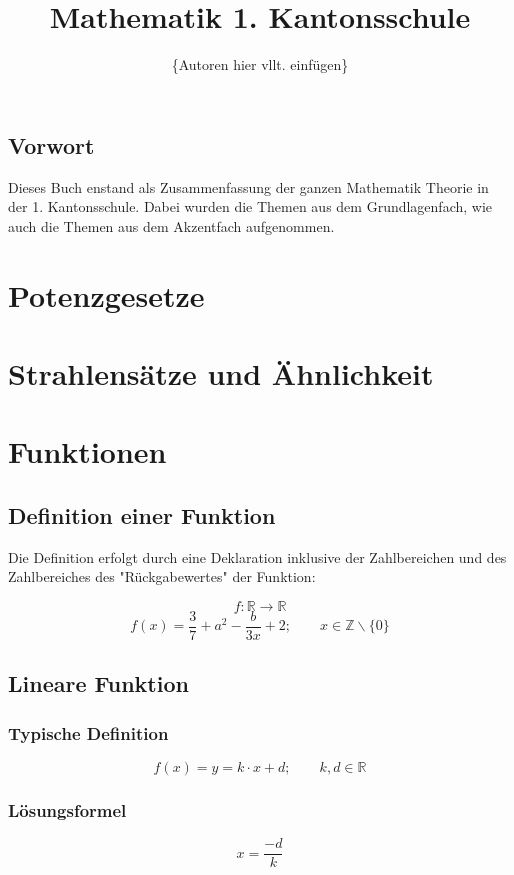 \documentclass[12pt,a4paper]{scrbook}
\author{\{Autoren hier vllt. einfügen\}}
\title{Mathematik 1. Kantonsschule}
\begin{document}

\maketitle
\section*{Vorwort}
Dieses Buch enstand als Zusammenfassung der ganzen Mathematik Theorie in der 1. Kantonsschule.
Dabei wurden die Themen aus dem Grundlagenfach, wie auch die Themen aus dem Akzentfach
aufgenommen.

\makeatletter
\renewcommand*\cleardoublepage{\clearpage\if@twoside
  \ifodd\c@page \hbox{}\newpage\if@twocolumn\hbox{}%
  \newpage\fi\fi\fi}
\makeatother

\tableofcontents
\newpage


\chapter{Potenzgesetze}


\chapter{Strahlensätze und Ähnlichkeit}


\chapter{Funktionen}
\section{Definition einer Funktion}
Die Definition erfolgt durch eine Deklaration inklusive
der Zahlbereichen und des Zahlbereiches des "Rückgabewertes" der Funktion:

\[ f : \mathbb{R} \rightarrow \mathbb{R}\]
\[ f(x) = \frac{3}{7} + a^2 - \frac{b}{3x} + 2; \quad\quad x \in \mathbb{Z}\backslash\{0\}\]

\section{Lineare Funktion}
\subsection{Typische Definition}
\[f(x) = y = k \cdot x + d; \quad\quad k, d \in \mathbb{R}\]
\subsection{Lösungsformel}
\[x = \frac{-d}{k}\]
\end{document}
